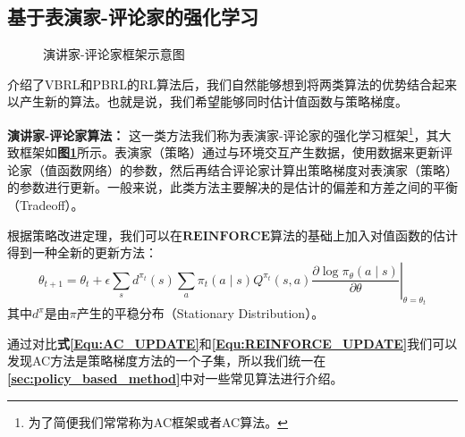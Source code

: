 \subsection{基于表演家-评论家的强化学习}
\begin{figure}[!t]
	\centering
	\caption{演讲家-评论家框架示意图}
	\label{Fig: AC frameworks}
\end{figure}

介绍了VBRL和PBRL的RL算法后，我们自然能够想到将两类算法的优势结合起来以产生新的算法。也就是说，我们希望能够同时估计值函数与策略梯度。

\textbf{演讲家-评论家算法：} 这一类方法我们称为表演家-评论家的强化学习框架\footnote{为了简便我们常常称为AC框架或者AC算法。}，其大致框架如\textbf{图\ref{Fig: AC frameworks}}所示。表演家（策略）通过与环境交互产生数据，使用数据来更新评论家（值函数网络）的参数，然后再结合评论家计算出策略梯度对表演家（策略）的参数进行更新。一般来说，此类方法主要解决的是估计的偏差和方差之间的平衡（Tradeoff）。

根据策略改进定理，我们可以在$\mathbf{REINFORCE} $算法的基础上加入对值函数的估计得到一种全新的更新方法：
\begin{equation}
    \theta_{t+1}=\theta_{t}+\left.\epsilon \sum_{s} d^{\pi_{t}}(s) \sum_{a} \pi_{t}(a \mid s) Q^{\pi_{t}}(s, a) \frac{\partial \log \pi_{\theta}(a \mid s)}{\partial \theta}\right|_{\theta=\theta_{t}}
    \label{Equ:AC_UPDATE}
\end{equation}
其中$d^{\pi}$是由$\pi$产生的平稳分布（Stationary Distribution）。

通过对比\textbf{式\eqref{Equ:AC_UPDATE}}和\textbf{\eqref{Equ:REINFORCE_UPDATE}}我们可以发现AC方法是策略梯度方法的一个子集，所以我们统一在\textbf{\ref{sec:policy_based_method}}中对一些常见算法进行介绍。

